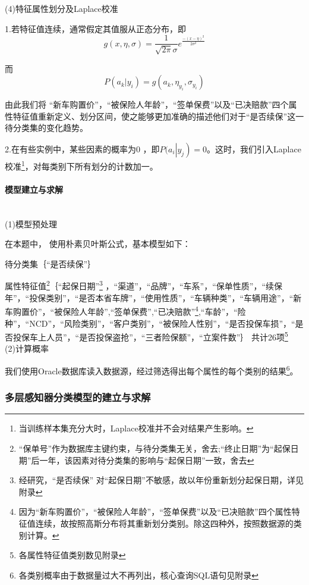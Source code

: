 \documentclass[UTF8,12pt,songti]{ctexart}
\begin{document}
(4)特征属性划分及Laplace校准\par
1.若特征值连续，通常假定其值服从正态分布，即
\begin{equation}\label{bayes5}
  g(x,\eta ,\sigma )=\frac{1}{\sqrt{2\pi }\sigma }e^{\frac{-(x-\eta )^{2}}{2\sigma ^{2}}}
\end{equation}
\par 而
\begin{equation}\label{bayes6}
  P(a_{k}\big|y_{i})=g(a_{k},\eta _{y_{i}},\sigma _{y_{i}})
\end{equation}
\par
由此我们将 “新车购置价”，“被保险人年龄”，“签单保费”以及“已决赔款”四个属性特征值重新定义、划分区间，使之能够更加准确的描述他们对于“是否续保”这一待分类集的变化趋势。\par
2.在有些实例中，某些因素的概率为0 ，即$P(a_i\left|y_j\right)=0$。这时，我们引入Laplace校准\footnote{当训练样本集充分大时，Laplace校准并不会对结果产生影响。}，对每类别下所有划分的计数加一。
\paragraph{模型建立与求解} \quad \\
(1)模型预处理\par
在本题中， 使用朴素贝叶斯公式，基本模型如下：\par
待分类集｛“是否续保”｝\par
属性特征值\footnote{“保单号”作为数据库主键约束，与待分类集无关，舍去;“终止日期”为“起保日期”后一年，该因素对待分类集的影响与“起保日期”一致，舍去}｛“起保日期”\footnote{经研究，“是否续保” 对“起保日期”不敏感，故以年份重新划分起保日期，详见附录} ，“渠道”，“品牌”，“车系”，“保单性质”，“续保年”，“投保类别”，“是否本省车牌”，“使用性质”，“车辆种类”，“车辆用途”，“新车购置价”，“被保险人年龄”,“签单保费”,“已决赔款”\footnote{因为“新车购置价”，“被保险人年龄”，“签单保费”以及“已决赔款”四个属性特征值连续，故按照高斯分布将其重新划分类别。除这四种外，按照数据源的类别计算。},“车龄”，“险种”，“NCD”，“风险类别”，“客户类别”，“被保险人性别”，“是否投保车损”，“是否投保车上人员”，“是否投保盗抢”，“三者险保额”，“立案件数”｝ 共计26项\footnote{各属性特征值类别数见附录}\\
(2)计算概率 \par
我们使用Oracle数据库读入数据源，经过筛选得出每个属性的每个类别的结果\footnote{各类别概率由于数据量过大不再列出，核心查询SQL语句见附录}。
\subsubsection{多层感知器分类模型的建立与求解}
\end{document}

